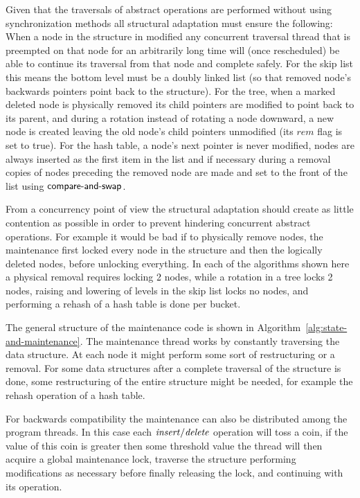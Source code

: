 {Given that the traversals of abstract operations are performed without using synchronization methods 
all structural adaptation must ensure the following:
When a node in the structure in modified 
any concurrent traversal thread that is preempted on that node for an arbitrarily long time will (once rescheduled) be able to continue its traversal from that node
and complete safely.
For the skip list this means the bottom level must be a doubly linked list (so that removed node's backwards pointers point back to the structure).
For the tree, when a marked deleted node is physically removed its child pointers are modified to point back to its parent, and during a rotation instead of rotating a node
downward, a new node is created leaving the old node's child pointers unmodified (its $rem$ flag is set to true).
For the hash table, a node's next pointer is never modified, nodes are always inserted as the first item in the list and if necessary during a removal copies of
nodes preceding the removed node are made and set to the front of the list using $\lit{compare-and-swap}$.

From a concurrency point of view the structural adaptation should create as little contention as possible in order to prevent hindering concurrent abstract operations.
For example it would be bad if to physically remove nodes, the maintenance first locked every node in the structure and then the logically
deleted nodes, before unlocking everything.
In each of the algorithms shown here a physical removal requires locking 2 nodes, while a rotation in a tree locks 2 nodes,
raising and lowering of levels in the skip list locks no nodes, and performing a rehash of a hash table is done per bucket.

The general structure of the maintenance code is shown in Algorithm~\ref{alg:state-and-maintenance}.
The maintenance thread works by constantly traversing the data structure.
At each node it might perform some sort of restructuring or a removal.
For some data structures after a complete traversal of the structure is done, some restructuring of the entire structure might be needed,
for example the rehash operation of a hash table.

For backwards compatibility the maintenance can also be distributed among the program threads.
In this case each $\ms{insert/delete}$ operation will toss a coin, if the value of this coin is greater then some threshold value
the thread will then acquire a global maintenance lock, traverse the structure performing modifications as necessary before finally
releasing the lock, and continuing with its operation.


}

